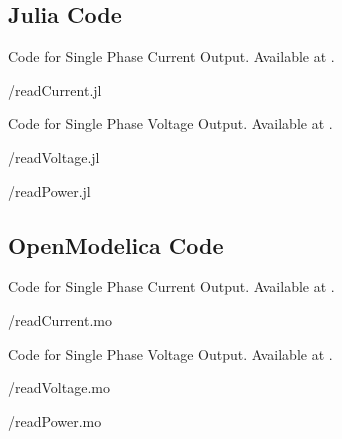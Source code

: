 \subsection{Julia Code}
\label{sec:modbus-julia-code}

\begin{juliacode}
{Code for Single Phase Current Output.
  Available at .}
\label{julia:current-modbus}

{\LocMODjuliacode/readCurrent.jl}
\end{juliacode}

\begin{juliacode}
{Code for Single Phase Voltage Output.
  Available at .}
\label{julia:voltage-modbus}

{\LocMODjuliacode/readVoltage.jl}
\end{juliacode}

\begin{juliacode}
\label{julia:modbus-power}

{\LocMODjuliacode/readPower.jl}
\end{juliacode}

\subsection{OpenModelica Code}
\label{sec:modbus-OpenModelica-code}

\begin{OpenModelicacode}
{Code for Single Phase Current Output.
  Available at .}
\label{OpenModelica:current-modbus}

{\LocMODOpenModelicacode/readCurrent.mo}
\end{OpenModelicacode}

\begin{OpenModelicacode}
{Code for Single Phase Voltage Output.
  Available at .}
\label{OpenModelica:voltage-modbus}

{\LocMODOpenModelicacode/readVoltage.mo}
\end{OpenModelicacode}

\begin{OpenModelicacode}
\label{OpenModelica:modbus-power}

{\LocMODOpenModelicacode/readPower.mo}
\end{OpenModelicacode}
